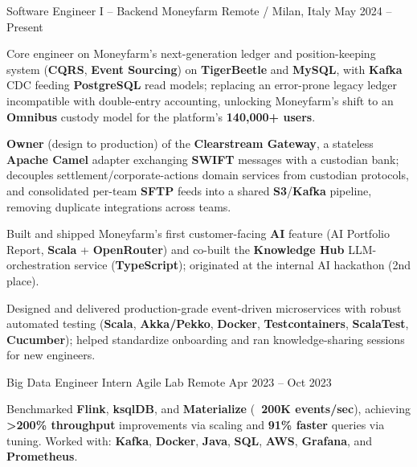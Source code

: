 
\begin{cventries}

\cventry
{Software Engineer I – Backend} %
{Moneyfarm} %
{Remote / Milan, Italy} %
{May 2024 – Present} %
{
  \begin{cvitems}
  \item {Core engineer on Moneyfarm's next-generation ledger and position-keeping system (\textbf{CQRS}, \textbf{Event Sourcing}) on \textbf{TigerBeetle} and \textbf{MySQL}, with \textbf{Kafka} CDC feeding \textbf{PostgreSQL} read models; replacing an error-prone legacy ledger incompatible with double-entry accounting, unlocking Moneyfarm's shift to an \textbf{Omnibus} custody model for the platform's \textbf{140,000+ users}.}
  \item {\textbf{Owner} (design to production) of the \textbf{Clearstream Gateway}, a stateless \textbf{Apache Camel} adapter exchanging \textbf{SWIFT} messages with a custodian bank; decouples settlement/corporate-actions domain services from custodian protocols, and consolidated per-team \textbf{SFTP} feeds into a shared \textbf{S3}/\textbf{Kafka} pipeline, removing duplicate integrations across teams.}
  \item {Built and shipped Moneyfarm's first customer-facing \textbf{AI} feature (AI Portfolio Report, \textbf{Scala} + \textbf{OpenRouter}) and co-built the \textbf{Knowledge Hub} LLM-orchestration service (\textbf{TypeScript}); originated at the internal AI hackathon (2nd place).}
  \item {Designed and delivered production-grade event-driven microservices with robust automated testing (\textbf{Scala}, \textbf{Akka/Pekko}, \textbf{Docker}, \textbf{Testcontainers}, \textbf{ScalaTest}, \textbf{Cucumber}); helped standardize onboarding and ran knowledge-sharing sessions for new engineers.}
\end{cvitems}
}

\cventry
{Big Data Engineer Intern} %
{Agile Lab} %
{Remote} %
{Apr 2023 – Oct 2023} %
{
  \begin{cvitems}
  \item Benchmarked \textbf{Flink}, \textbf{ksqlDB}, and \textbf{Materialize} (\textbf{~200K events/sec}), achieving \textbf{>200\% throughput} improvements via scaling and \textbf{91\% faster} queries via tuning. Worked with: \textbf{Kafka}, \textbf{Docker}, \textbf{Java}, \textbf{SQL}, \textbf{AWS}, \textbf{Grafana}, and \textbf{Prometheus}.
  \end{cvitems}
}


\end{cventries}
